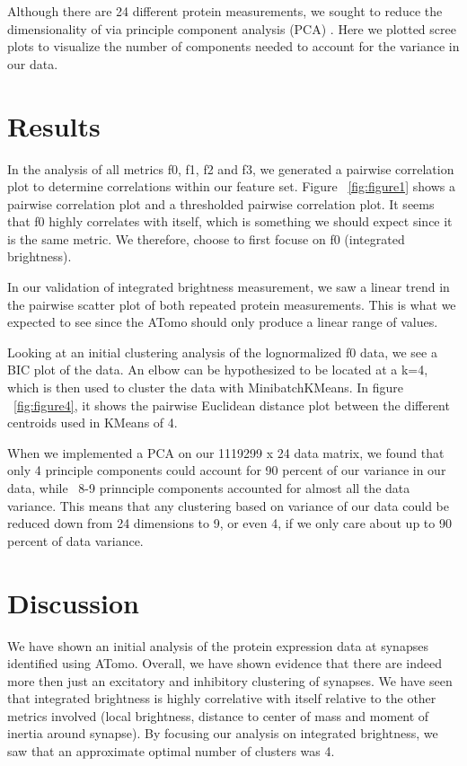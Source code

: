 \documentclass{article}
\begin{document}
Although there are 24 different protein measurements, we sought to reduce the dimensionality of via principle component analysis (PCA) \cite{Wold1987}. Here we plotted scree plots to visualize the number of components needed to account for the variance in our data.

\section{Results}
In the analysis of all metrics f0, f1, f2 and f3, we generated a pairwise correlation plot to determine correlations within our feature set. Figure ~\ref{fig:figure1} shows a pairwise correlation plot and a thresholded pairwise correlation plot. It seems that f0 highly correlates with itself, which is something we should expect since it is the same metric. We therefore, choose to first focuse on f0 (integrated brightness). 

In our validation of integrated brightness measurement, we saw a linear trend in the pairwise scatter plot of both repeated protein measurements. This is what we expected to see since the ATomo should only produce a linear range of values.

Looking at an initial clustering analysis of the lognormalized f0 data, we see a BIC plot of the data. An elbow can be hypothesized to be located at a k=4, which is then used to cluster the data with MinibatchKMeans. In figure ~\ref{fig:figure4}, it shows the pairwise Euclidean distance plot between the different centroids used in KMeans of 4. 

When we implemented a PCA on our 1119299 x 24 data matrix, we found that only 4 principle components could account for 90 percent of our variance in our data, while ~8-9 prinnciple components accounted for almost all the data variance. This means that any clustering based on variance of our data could be reduced down from 24 dimensions to 9, or even 4, if we only care about up to 90 percent of data variance.

\section{Discussion}
We have shown an initial analysis of the protein expression data at synapses identified using ATomo. Overall, we have shown evidence that there are indeed more then just an excitatory and inhibitory clustering of synapses. We have seen that integrated brightness is highly correlative with itself relative to the other metrics involved (local brightness, distance to center of mass and moment of inertia around synapse). By focusing our analysis on integrated brightness, we saw that an approximate optimal number of clusters was 4.
\end{document}
